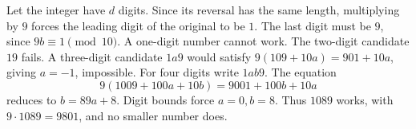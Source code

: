 Let the integer have $d$ digits. Since its reversal has the same length, multiplying by $9$ forces the leading digit of the original to be $1$. The last digit must be $9$, since $9b\equiv1\pmod{10}$. A one-digit number cannot work.
The two-digit candidate $19$ fails. A three-digit candidate $1a9$ would satisfy $9(109+10a)=901+10a$, giving $a=-1$, impossible.
For four digits write $1ab9$. The equation
\[
9(1009+100a+10b)=9001+100b+10a
\]
reduces to $b=89a+8$. Digit bounds force $a=0,b=8$. Thus $\boxed{1089}$ works, with $9\cdot1089=9801$, and no smaller number does.
